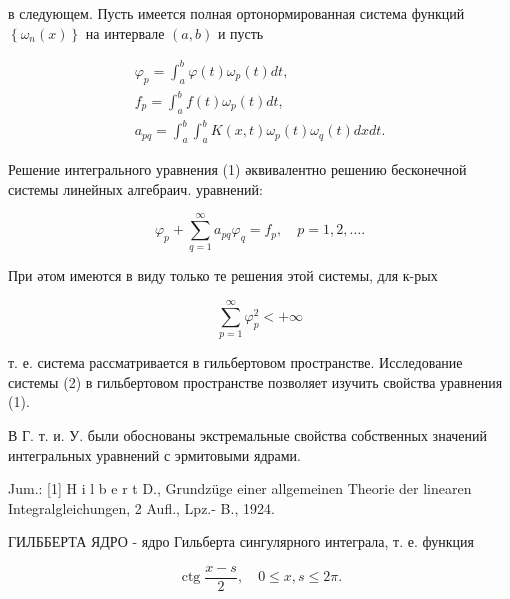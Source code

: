\documentclass[10pt]{article}
\begin{document}
в следующем. Пусть имеется полная ортонормированная система функций $\left\{\omega_{n}(x)\right\}$ на интервале $(a, b)$ и пусть



\[

\begin{gathered}

\varphi_{p}=\int_{a}^{b} \varphi(t) \omega_{p}(t) d t, \\

f_{p}=\int_{a}^{b} f(t) \omega_{p}(t) d t, \\

a_{p q}=\int_{a}^{b} \int_{a}^{b} K(x, t) \omega_{p}(t) \omega_{q}(t) d x d t .

\end{gathered}

\]



Решение интегрального уравнения (1) әквивалентно решению бесконечной системы линейных алгебраич. уравнений:



\[

\varphi_{p}+\sum_{q=1}^{\infty} a_{p q} \varphi_{q}=f_{p}, \quad p=1,2, \ldots .

\]



При әтом имеются в виду только те решения этой системы, для к-рых



\[

\sum_{p=1}^{\infty} \varphi_{p}^{2}<+\infty

\]



т. е. система рассматривается в гильбертовом пространстве. Исследование системы (2) в гильбертовом пространстве позволяет изучить свойства уравнения (1).



В Г. т. и. У. были обоснованы экстремальные свойства собственных значений интегральных уравнений с эрмитовыми ядрами.



Jum.: [1] H i l b e r t D., Grundzüge einer allgemeinen Theorie der linearen Integralgleichungen, 2 Aufl., Lpz.- B., 1924.



ГИЛББЕРТА ЯДРО - ядро Гильберта сингулярного интеграла, т. е. функция



\[

\operatorname{ctg} \frac{x-s}{2}, \quad 0 \leqslant x, s \leqslant 2 \pi .

\]
\end{document}

